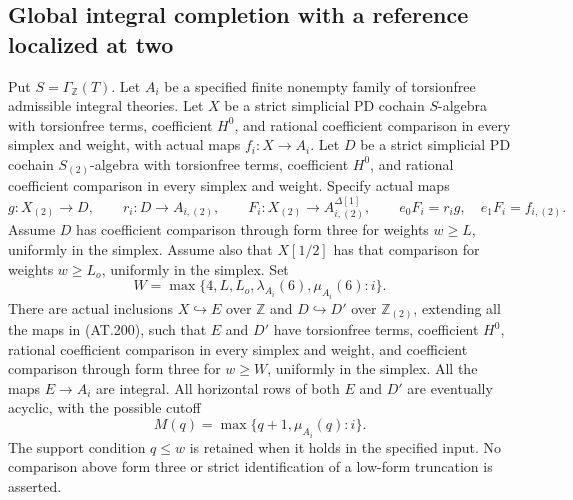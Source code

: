 \subsection{Global integral completion with a reference localized at two}

\begin{theorem}
\label{AT29}
Put $S=\Gamma_{\mathbb Z}(T)$.
Let $A_i$ be a specified finite nonempty family of torsionfree admissible
integral theories. Let $X$ be a strict simplicial PD cochain $S$-algebra
with torsionfree terms, coefficient $H^0$, and rational coefficient
comparison in every simplex and weight, with actual maps $f_i:X\to A_i$.
Let $D$ be a strict simplicial PD cochain $S_{(2)}$-algebra with
torsionfree terms, coefficient $H^0$, and rational coefficient comparison
in every simplex and weight. Specify actual maps
\[
 g:X_{(2)}\longrightarrow D,\qquad
 r_i:D\longrightarrow A_{i,(2)},\qquad
 F_i:X_{(2)}\longrightarrow A_{i,(2)}^{\Delta[1]},\qquad
 e_0F_i=r_i g,\quad e_1F_i=f_{i,(2)}.
 \tag{AT.200}
\]
Assume $D$ has coefficient comparison through form three for weights
$w\geq L$, uniformly in the simplex. Assume also that $X[1/2]$ has
that comparison for weights $w\geq L_o$, uniformly in the simplex.
Set
\[
 W=\max\{4,L,L_o,\lambda_{A_i}(6),\mu_{A_i}(6):i\}.
 \tag{AT.201}
\]
There are actual inclusions $X\hookrightarrow E$ over $\mathbb Z$
and $D\hookrightarrow D'$ over $\mathbb Z_{(2)}$, extending all the
maps in \textup{(AT.200)}, such that $E$ and $D'$ have torsionfree
terms, coefficient $H^0$, rational coefficient comparison in every
simplex and weight, and coefficient comparison through form three
for $w\geq W$, uniformly in the simplex. All the maps $E\to A_i$
are integral. All horizontal rows of both $E$ and $D'$ are eventually
acyclic, with the possible cutoff
\[
                  M(q)=\max\{q+1,\mu_{A_i}(q):i\}.
 \tag{AT.202}
\]
The support condition $q\leq w$ is retained when it holds in the
specified input. No comparison above form three or strict
identification of a low-form truncation is asserted.
\end{theorem}

